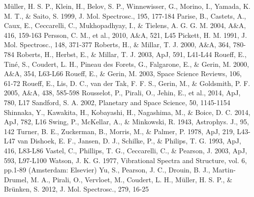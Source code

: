 \documentclass[twocolumn]{aastex61}
\begin{document}
\begin{thebibliography}{}
 M\"{u}ller, H. S. P., Klein, H., Belov, S. P., Winnewisser, G., Morino, I., Yamada, K. M. T., \& Saito, S. 1999, J. Mol. Spectrosc., 195, 177-184
 Parise, B., Castets, A., Caux, E., Ceccarelli, C., Mukhopadhyay, I., \&  Tielens, A. G. G. M. 2004, A\&A, 416, 159-163
 Persson, C. M., et al., 2010, A\&A, 521, L45
 Pickett, H. M. 1991, J. Mol. Spectrosc., 148, 371-377
 Roberts, H., \& Millar, T. J. 2000, A\&A, 364, 780-784
 Roberts, H., Herbst, E., \& Millar, T. J. 2003, ApJ, 591, L41-L44
 Roueff, E., Tiné, S., Coudert, L. H., Pineau des Forets, G., Falgarone, E., \& Gerin, M. 2000, A\&A, 354, L63-L66
 Roueff, E., \& Gerin, M. 2003, Space Science Reviews, 106, 61-72
 Roueff, E., Lis, D. C., van der Tak, F. F. S., Gerin, M., \& Goldsmith, P. F. 2005, A\&A, 438, 585-598
 Rousselot, P., Pirali, O., Jehin, E., et al., 2014, ApJ, 780, L17
 Sandford, S. A. 2002, Planetary and Space Science, 50, 1145-1154
 Shinnaka, Y., Kawakita, H., Kobayashi, H., Nagashima, M., \& Boice, D. C. 2014, ApJ, 782, L16
 Swing, P., McKellar, A., \& Minkowski, R. 1943, Astrophys. J., 95, 142
 Turner, B. E., Zuckerman, B., Morris, M., \& Palmer, P. 1978, ApJ, 219, L43-L47
 van Dishoek, E. F., Jansen, D. J., Schilke, P., \& Philips, T. G. 1993, ApJ, 416, L83-L86
 Vastel, C., Phillips, T. G., Ceccarelli, C., \& Pearson, J. 2003, ApJ, 593, L97-L100
Watson, J. K. G. 1977, Vibrational Spectra and Structure, vol. 6, pp.1-89 (Amsterdam: Elsevier)
 Yu, S., Pearson, J. C., Drouin, B. J., Martin-Drumel, M. A., Pirali, O., Vervloet, M., Coudert, L. H., M{\"u}ller, H. S. P., \& Br{\"u}nken, S. 2012, J. Mol. Spectrosc., 279, 16-25 
\end{thebibliography}
\end{document}
